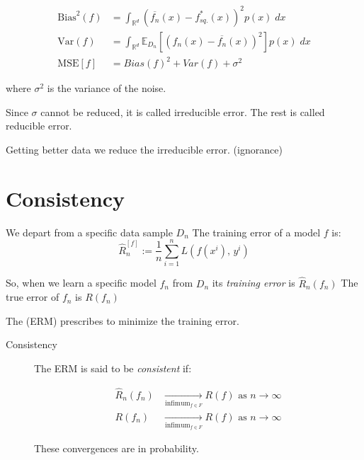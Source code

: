 \begin{align*}
	\text{Bias}^2(f) & = \int_{\mathds{R}^d} \left( \overline{f_n}(x) - f_{sq.}^*(x) \right)^2 p(x)\; dx                           \\
	\text{Var}(f)    & = \int_{\mathds{R}^d} \mathds{E}_{D_n} \left[ \left( f_n(x) - \overline{f_n}(x) \right)^2 \right] p(x)\; dx \\
	\text{MSE}[f]    & = Bias(f)^2 + Var(f) + \sigma^2
\end{align*}

where \(\sigma^2\) is the variance of the noise.

Since \(\sigma\) cannot be reduced, it is called irreducible error. The
rest is called reducible error. 

Getting better data we reduce the irreducible error. (ignorance)

\section{Consistency}

We depart from a specific data sample \(D_n\) The training error of a
model \(f\) is:
\begin{equation*}
	\hat{R}_n^{[f]} := \frac{1}{n} \sum_{i=1}^n L(f(x^i),\, y^i)
\end{equation*}

So, when we learn a specific model \(f_n\) from \(D_n\) its
\emph{training error} is \(\hat{R}_n(f_n)\) The true error of \(f_n\)
is \(R(f_n)\)

The  (ERM) prescribes to minimize the
training error. 

\begin{description}
	\item[Consistency]
		The ERM is said to be \emph{consistent} if:

		\begin{align*}
			\hat{R}_n(f_n) & \xrightarrow[\text{infimum}_{f \in F}]{} R(f)
			\text{ as } n \rightarrow \infty                               \\
			R(f_n)         & \xrightarrow[\text{infimum}_{f \in F}]{} R(f)
			\text{ as } n \rightarrow \infty
		\end{align*}

		These convergences are in probability.
\end{description}

